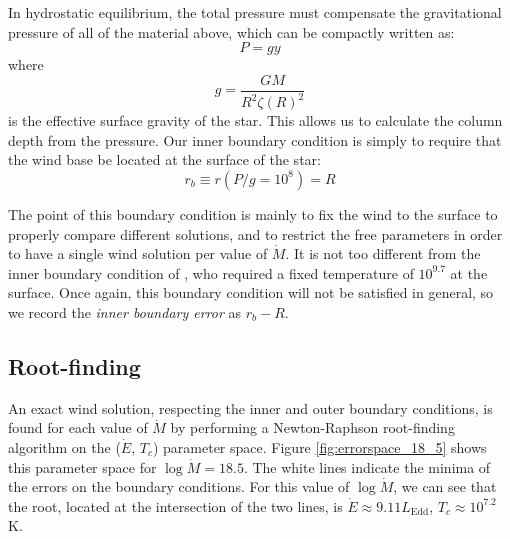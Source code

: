 \documentclass[../main.tex]{subfiles}
\newcommand{\Ledd}{L_\text{Edd}}
\newcommand{\Mdot}{\dot{M}}
\begin{document}
In hydrostatic equilibrium, the total pressure must compensate the gravitational pressure of all of the material above, which can be compactly written as:
\begin{equation}
    P=gy
\end{equation}
where
\begin{equation}
    g=\frac{GM}{R^2\zeta(R)^2}
\end{equation}
is the effective surface gravity of the star. This allows us to calculate the column depth from the pressure. Our inner boundary condition is simply to require that the wind base be located at the surface of the star:
\begin{equation}\label{eq:wind_innerBC}
    r_b\equiv r(P/g=10^8) = R
\end{equation}

The point of this boundary condition is mainly to fix the wind to the surface to properly compare different solutions, and to restrict the free parameters in order to have a single wind solution per value of $\Mdot$. It is not too different from the inner boundary condition of \citet{Paczynski1986b}, who required a fixed temperature of $10^{9.7}$ at the surface. Once again, this boundary condition will not be satisfied in general, so we record the \textit{inner boundary error} as $r_b-R$.

\subsection{Root-finding}\label{section:wind_rootfinding}
An exact wind solution, respecting the inner and outer boundary conditions, is found for each value of $\dot{M}$ by performing a Newton-Raphson root-finding algorithm on the ($\dot{E}$, $T_c$) parameter space. Figure \ref{fig:errorspace_18_5} shows this parameter space for $\log\dot{M}=18.5$. The white lines indicate the minima of the errors on the boundary conditions. For this value of $\log\dot{M}$, we can see that the root, located at the intersection of the two lines, is $\dot{E}\approx 9.11\Ledd$, $T_c\approx 10
^{7.2}$ K. \\
\end{document}
